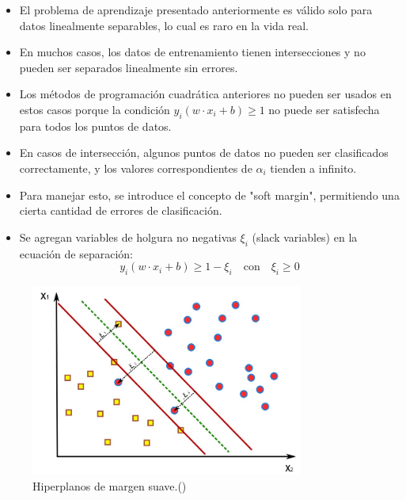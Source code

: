 \begin{itemize}
	\item El problema de aprendizaje presentado anteriormente es válido solo para datos linealmente separables, lo cual es raro en la vida real.
	\item En muchos casos, los datos de entrenamiento tienen intersecciones y no pueden ser separados linealmente sin errores.
	\item Los métodos de programación cuadrática anteriores no pueden ser usados en estos casos porque la condición $ y_i ( w \cdot x_i + b ) \geq 1 $ no puede ser satisfecha para todos los puntos de datos.
	\item En casos de intersección, algunos puntos de datos no pueden ser clasificados correctamente, y los valores correspondientes de $ \alpha_i $ tienden a infinito.
	\item Para manejar esto, se introduce el concepto de "soft margin", permitiendo una cierta cantidad de errores de clasificación.
	\item Se agregan variables de holgura no negativas $ \xi_i $ (slack variables) en la ecuación de separación:
	\[
	y_i ( w \cdot x_i + b ) \geq 1 - \xi_i \quad \text{con} \quad \xi_i \geq 0
	\]
\end{itemize}
\begin{figure}[H]
	\begin{center}
		\includegraphics[width=0.8\textwidth]{2/figures/svm3.jpeg}
		\caption{Hiperplanos de margen suave.(\cite{tecnica3})}
	\end{center}
\end{figure}


